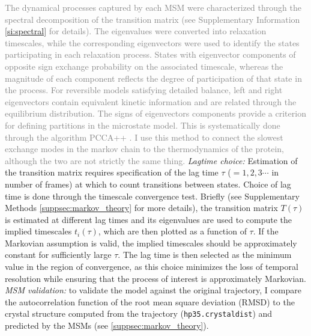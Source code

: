 \textcolor{gray}{
The dynamical processes captured by each MSM were characterized through the spectral decomposition of the transition matrix (see Supplementary Information \ref{si:spectral} for details). 
The eigenvalues were converted into relaxation timescales, while the corresponding eigenvectors were used to identify the states participating in each relaxation process. 
States with eigenvector components of opposite sign exchange probability on the associated timescale, whereas the magnitude of each component reflects the degree of participation
of that state in the process. For reversible models satisfying detailed balance, left and right eigenvectors contain equivalent kinetic information
and are related through the equilibrium distribution.
The signs of eigenvectors components provide a criterion for defining partitions in the microstate model. This is systematically done through the algorithm PCCA++ \cite[Ch. 2.5.1 and 2.5.2]{thebible}. I use this method to connect
the slowest exchange modes in the markov chain to the thermodynamics of the protein, although the two are not strictly the same thing. 
}
\vspace{0.1em} \newline \textit{Lagtime choice:}
Estimation of the transition matrix requires specification of the lag time $\tau$ ($= 1, 2, 3\cdots$ in number of frames) at which to count transitions between states. Choice of lag time is done through the
timescale convergence test. Briefly (see Supplementary Methods \ref{suppsec:markov_theory} for more details), the transition matrix $T(\tau)$  is estimated at different lag times and its eigenvalues are used to compute the implied timescales $t_i(\tau)$, which are then plotted as a function of $\tau$. 
If the Markovian assumption is valid, the implied timescales should be approximately constant for sufficiently large $\tau$. The lag time is then selected as the minimum value in the region of convergence, as this choice minimizes the loss of temporal resolution while ensuring that the process of interest is approximately Markovian\cite[Ch. 4.7]{thebible}.
\vspace{0.1em} \newline \textit{MSM validation:} to validate the model against the original trajectory, I compare the autocorrelation function of the root mean square deviation (RMSD) to the crystal structure computed from the trajectory (\texttt{hp35.crystaldist}) and predicted by the MSMs (see \ref{suppsec:markov_theory}).
%